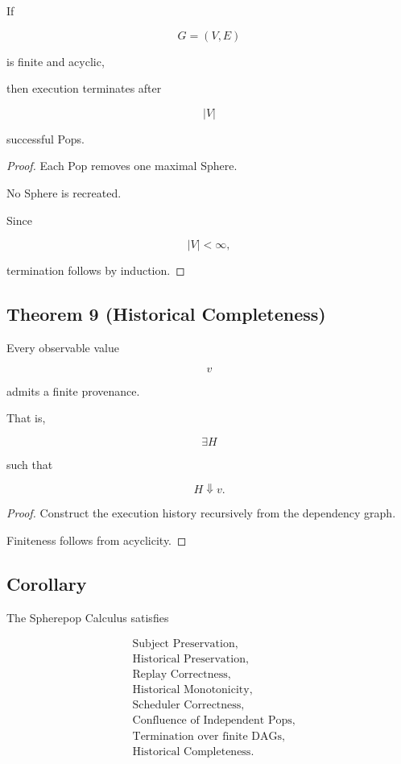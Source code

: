 \documentclass[12pt,oneside]{article}
\theoremstyle{definition}
\theoremstyle{remark}
\begin{document}
If

\[
G=(V,E)
\]

is finite and acyclic,

then execution terminates after

\[
|V|
\]

successful Pops.

\begin{proof}

Each Pop removes one maximal Sphere.

No Sphere is recreated.

Since

\[
|V|
<\infty,
\]

termination follows by induction.

\end{proof}

\subsection*{Theorem 9 (Historical Completeness)}

Every observable value

\[
v
\]

admits a finite provenance.

That is,

\[
\exists
H
\]

such that

\[
H
\Downarrow
v.
\]

\begin{proof}

Construct the execution history recursively from the dependency graph.

Finiteness follows from acyclicity.

\end{proof}

\subsection*{Corollary}

The Spherepop Calculus satisfies

\[
\boxed{
\begin{aligned}
&\text{Subject Preservation},\\
&\text{Historical Preservation},\\
&\text{Replay Correctness},\\
&\text{Historical Monotonicity},\\
&\text{Scheduler Correctness},\\
&\text{Confluence of Independent Pops},\\
&\text{Termination over finite DAGs},\\
&\text{Historical Completeness}.
\end{aligned}
}
\]
\end{document}
